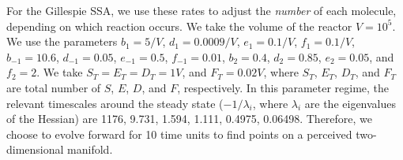 For the Gillespie SSA, we use these rates to adjust the {\em number} of each molecule, depending on which reaction occurs.
%
We take the volume of the reactor $V=10^5$.
%
We use the parameters $b_1=5/V$, $d_1=0.0009/V$, $e_1=0.1/V$, $f_1=0.1/V$, $b_{-1} = 10.6$, $d_{-1}=0.05$, $e_{-1}=0.5$, $f_{-1} =0.01$, $b_2=0.4$, $d_2=0.85$, $e_2=0.05$, and $f_2=2$.
%
We take $S_T=E_T=D_T=1V$, and $F_T=0.02V$, where $S_T$, $E_T$, $D_T$, and $F_T$ are total number of $S$, $E$, $D$, and $F$, respectively.
%
In this parameter regime, the relevant timescales around the steady state ($-1/\lambda_i$, where $\lambda_i$ are the eigenvalues of the Hessian) are 1176, 9.731, 1.594, 1.111, 0.4975, 0.06498.
%
Therefore, we choose to evolve forward for 10 time units to find points on a perceived two-dimensional manifold.
